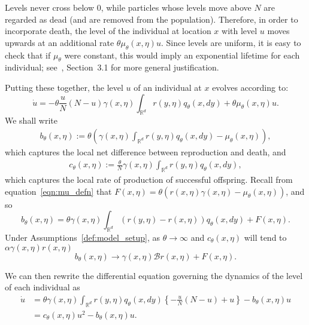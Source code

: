\documentclass[EJP]{ejpecp} %
\newcommand{\IR}{\mathbb R}
\newcommand{\DG}{\mathcal{B}}  %
\begin{document}
Levels never cross below 0, 
while particles whose levels move above $N$ are regarded as dead
(and are removed from the population).
Therefore, in order to incorporate death,
the level of the individual at location $x$ with level $u$
moves upwards at an additional rate $\theta\mu_\theta(x,\eta) u$.
Since levels are uniform,
it is easy to check that if $\mu_\theta$ were constant,
this would imply an exponential lifetime for each individual;
see~\cite{etheridge/kurtz:2019}, Section~3.1
for more general justification.

Putting these together,
the level $u$ of an individual at $x$ evolves according to:
\begin{equation} \label{eqn:dot_u}
    \dot u
    =
    - \theta\frac{u}{N} \left(N - u\right)
    \gamma(x, \eta) \int_{\IR^d} r(y, \eta) q_\theta(x, dy) 
    +
    \theta\mu_\theta(x,\eta) u .
\end{equation}
We shall write 
\begin{align*}
    b_\theta(x, \eta)
    :=
    \theta\left(
    \gamma(x,\eta) \int_{\IR^d} r(y, \eta) q_\theta(x, dy)
    -
    \mu_\theta(x,\eta)
    \right) ,
\end{align*}
which captures the local net difference between reproduction and death,
and
\begin{align} \label{c_defn}
    c_\theta(x, \eta)
    :=
    \frac{\theta}{N} \gamma(x, \eta) \int_{\IR^d} r(y, \eta) q_\theta(x, dy) ,
\end{align}
which captures the local rate of production of successful offspring.
Recall from equation~\eqref{eqn:mu_defn} that 
$F(x,\eta) = \theta(r(x,\eta)\gamma(x,\eta) - \mu_\theta(x,\eta))$,
and so 
\begin{equation}  \label{b_defn}
b_\theta(x, \eta)
=    \theta \gamma(x, \eta) \int_{\IR^d} \left( r(y, \eta) - r(x, \eta) \right) 
	q_\theta(x, dy)
    + F(x, \eta). 
\end{equation}
Under Assumptions~\ref{def:model_setup}, as $\theta \to \infty$ and
$c_\theta(x, \eta)$ will tend to $\alpha \gamma(x, \eta) r(x, \eta)$
\begin{equation}
\label{eqn:b_limit}
    b_\theta(x, \eta) \to \gamma(x, \eta) \DG r(x, \eta) + F(x, \eta) .
\end{equation}

We can then rewrite the differential equation 
governing the dynamics of the level of each individual as
\begin{align}
\dot{u}
    &=
    \theta\gamma(x,\eta) \int_{\IR^d} r(y, \eta) q_\theta(x, dy)
    \left\{
        -\frac{u}{N}\left(N - u\right)
        + u
    \right\}
    -
	b_\theta(x,\eta) u
    \nonumber \\
    &=
    c_\theta(x, \eta) u^2
    -
	b_\theta(x, \eta) u
    . \label{differential equation for level}
\end{align}
\end{document}
